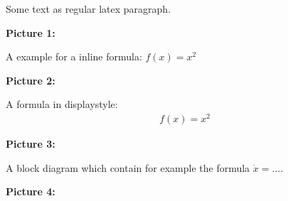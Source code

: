 \documentclass[11pt]{article}
\begin{document}
    Some text as regular latex paragraph.

    \textbf{Picture 1:}

        
    \vfill

    A example for a inline formula: $f(x) = x^2$

    \textbf{Picture 2:}

        
    \vfill

    A formula in displaystyle:
    \begin{align*}
        f(x) = x^2
    \end{align*}

    \textbf{Picture 3:}

        
    \vfill

    A block diagram which contain for example the formula $\dot x = \dots$.

    \textbf{Picture 4:}

        
\end{document}
